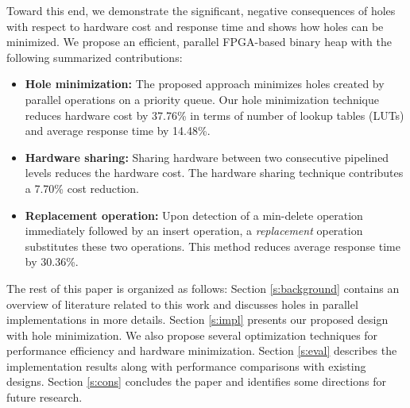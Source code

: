 Toward this end, we demonstrate the significant, negative consequences of holes with respect to hardware cost and response time and shows how holes can be minimized.
We propose an efficient, parallel FPGA-based binary heap with the following summarized contributions: 
\begin{itemize}
\item {\bf Hole minimization:} The proposed approach minimizes holes created by parallel operations on a priority queue. Our hole minimization technique reduces hardware cost by 37.76\% in terms of number of lookup tables (LUTs) and average response time by 14.48\%.
\item {\bf Hardware sharing:} Sharing hardware between two consecutive pipelined levels reduces the hardware cost. The hardware sharing technique contributes a 7.70\% cost reduction.
\item {\bf Replacement operation:} Upon detection of a min-delete operation immediately followed by an insert operation, a {\it replacement} operation substitutes these two operations. This method reduces average response time by 30.36\%.
\end{itemize}

The rest of this paper is organized as follows:
Section \autoref{s:background} contains an overview of literature related to this work and discusses holes in parallel implementations in more details.
Section \autoref{s:impl} presents our proposed design with hole minimization. 
We also propose several optimization techniques for performance efficiency and hardware minimization.
Section \autoref{s:eval} describes the implementation results along with performance comparisons with existing designs.
Section \autoref{s:cons} concludes the paper and identifies some directions for future research.
